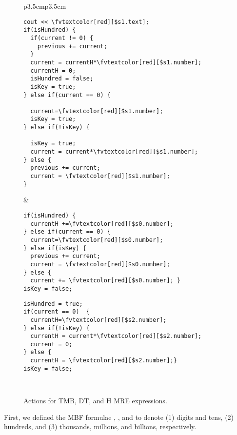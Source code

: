 \begin{figure}[tb!]
\centering
  \begin{tabular}{p{3.5cm}p{3.5cm}}
\begin{Verbatim}[fontsize=\relsize{-3.5},frame=single,label=TMB algorithm,commandchars=\\\[\]] 
cout << \fvtextcolor[red][$s1.text];
if(isHundred) {
  if(current != 0) {
    previous += current;
  }
  current = currentH*\fvtextcolor[red][$s1.number];
  currentH = 0;
  isHundred = false;
  isKey = true;
} else if(current == 0) {
  
  current=\fvtextcolor[red][$s1.number];
  isKey = true;
} else if(!isKey) {

  isKey = true;
  current = current*\fvtextcolor[red][$s1.number];
} else {
  previous += current;
  current = \fvtextcolor[red][$s1.number];
}
\end{Verbatim}
&
\begin{Verbatim}[fontsize=\relsize{-3.5},frame=single,label=DT algorithm,commandchars=\\\[\]] 
if(isHundred) {
  currentH +=\fvtextcolor[red][$s0.number];
} else if(current == 0) {
  current=\fvtextcolor[red][$s0.number];
} else if(isKey) {
  previous += current;
  current = \fvtextcolor[red][$s0.number];
} else {
  current += \fvtextcolor[red][$s0.number]; }
isKey = false;
\end{Verbatim}

\begin{Verbatim}[fontsize=\relsize{-3.5},frame=single,label=H algorithm,commandchars=\\\[\]] 
isHundred = true;
if(current == 0)  {
  currentH=\fvtextcolor[red][$s2.number];
} else if(!isKey) {
  currentH = current*\fvtextcolor[red][$s2.number];
  current = 0;
} else {
  currentH = \fvtextcolor[red][$s2.number];}
isKey = false;
\end{Verbatim}
\\ 
\end{tabular}
\caption{Actions for TMB, DT, and H MRE expressions.}
\label{fig:numnormalgo}
  \vspace{-1em}
\end{figure}

First, we defined the MBF formulae , , and 
to denote (1) digits and tens, (2) hundreds, and (3) 
thousands, millions, and billions, respectively.


